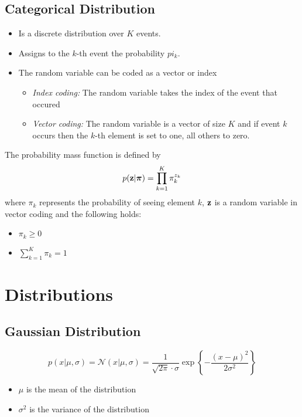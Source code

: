 \subsection{Categorical Distribution}
\begin{itemize}
\item Is a discrete distribution over \(K\) events.
\item Assigns to the \(k\)-th event the probability \(pi_k\).
\item The random variable can be coded as a vector or index
\begin{itemize}
\item \textit{Index coding:} The random variable takes the index of the event that occured
\item \textit{Vector coding:} The random variable is a vector of size \(K\) and if event \(k\) occurs then the \(k\)-th element is set to one, all others to zero.
\end{itemize}
\end{itemize}

\begin{definition}
The probability mass function is defined by \[
p(\boldsymbol{\mathrm{z}} | \boldsymbol{\mathrm{\pi}}) = \prod_{k=1}^K \pi_k^{z_k}
\]
where \(\pi_k\) represents the probability of seeing element \(k\), \(\boldsymbol{\mathrm{z}}\) is a random variable in vector coding and the following holds:
\begin{itemize}
\item \(\pi_k \geq 0\)
\item \(\sum_{k=1}^K \pi_k = 1\)
\end{itemize}
\end{definition}

\section{Distributions}
\subsection{Gaussian Distribution}
\begin{definition}
\[
p(x|\mu, \sigma) = \mathcal{N}(x|\mu, \sigma) = \frac{1}{\sqrt{2 \pi} \cdot \sigma} \exp \left\lbrace -\frac{(x - \mu)^2}{2\sigma^2} \right\rbrace
\]

\begin{itemize}
\item \(\mu\) is the mean of the distribution
\item \(\sigma^2\) is the variance of the distribution
\end{itemize}
\end{definition}

